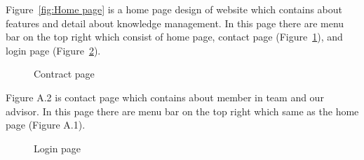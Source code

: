 \documentclass[12pt,oneside,openright,a4paper]{cpe-english-project}
\begin{document}
Figure~\ref*{fig:Home page} is a home page design of website which contains about features and detail 
about knowledge management. In this page there are menu bar on the top right which consist 
of home page, contact page (Figure~\ref*{fig:Contract page}), and login page (Figure~\ref*{fig:Login page}). 

\begin{figure}[!h]\centering
{}
\caption{Contract page}\label{fig:Contract page}
\end{figure}

Figure A.2 is contact page which contains about member in team and our advisor. In 
this page there are menu bar on the top right which same as the home page (Figure A.1).

\begin{figure}[!h]\centering
{}
\caption{Login page}\label{fig:Login page}
\end{figure}
\end{document}
